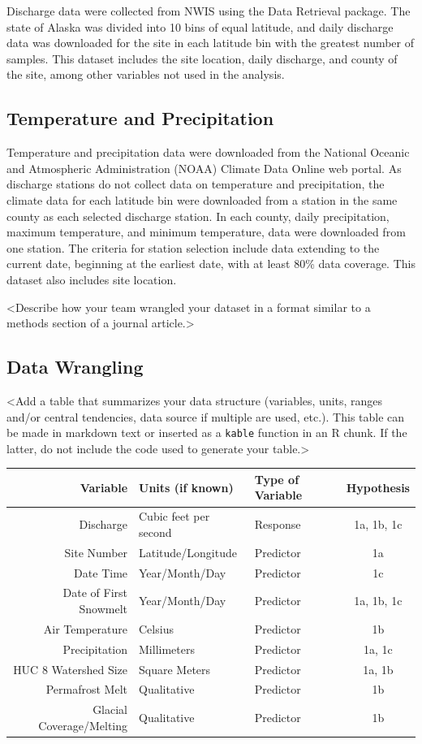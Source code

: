 \documentclass[12pt,]{article}
\begin{document}
Discharge data were collected from NWIS using the Data Retrieval
package. The state of Alaska was divided into 10 bins of equal latitude,
and daily discharge data was downloaded for the site in each latitude
bin with the greatest number of samples. This dataset includes the site
location, daily discharge, and county of the site, among other variables
not used in the analysis.

\hypertarget{temperature-and-precipitation}{%
\subsection{Temperature and
Precipitation}\label{temperature-and-precipitation}}

Temperature and precipitation data were downloaded from the National
Oceanic and Atmospheric Administration (NOAA) Climate Data Online web
portal. As discharge stations do not collect data on temperature and
precipitation, the climate data for each latitude bin were downloaded
from a station in the same county as each selected discharge station. In
each county, daily precipitation, maximum temperature, and minimum
temperature, data were downloaded from one station. The criteria for
station selection include data extending to the current date, beginning
at the earliest date, with at least 80\% data coverage. This dataset
also includes site location.

\textless{}Describe how your team wrangled your dataset in a format
similar to a methods section of a journal article.\textgreater{}

\hypertarget{data-wrangling}{%
\subsection{Data Wrangling}\label{data-wrangling}}

\textless{}Add a table that summarizes your data structure (variables,
units, ranges and/or central tendencies, data source if multiple are
used, etc.). This table can be made in markdown text or inserted as a
\texttt{kable} function in an R chunk. If the latter, do not include the
code used to generate your table.\textgreater{}

\begin{longtable}[]{@{}rllc@{}}
\toprule
Variable & Units (if known) & Type of Variable &
Hypothesis\tabularnewline
\midrule
\endhead
Discharge & Cubic feet per second & Response & 1a, 1b, 1c\tabularnewline
Site Number & Latitude/Longitude & Predictor & 1a\tabularnewline
Date Time & Year/Month/Day & Predictor & 1c\tabularnewline
Date of First Snowmelt & Year/Month/Day & Predictor & 1a, 1b,
1c\tabularnewline
Air Temperature & Celsius & Predictor & 1b\tabularnewline
Precipitation & Millimeters & Predictor & 1a, 1c\tabularnewline
HUC 8 Watershed Size & Square Meters & Predictor & 1a, 1b\tabularnewline
Permafrost Melt & Qualitative & Predictor & 1b\tabularnewline
Glacial Coverage/Melting & Qualitative & Predictor & 1b\tabularnewline
\bottomrule
\end{longtable}
\end{document}
